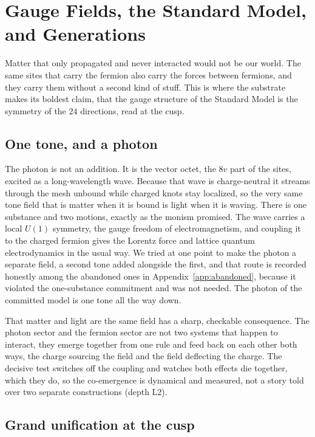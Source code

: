 \section{Gauge Fields, the Standard Model, and Generations}

Matter that only propagated and never interacted would not be our world. The same sites that carry the fermion also carry the forces between fermions, and they carry them without a second kind of stuff. This is where the substrate makes its boldest claim, that the gauge structure of the Standard Model is the symmetry of the $24$ directions, read at the cusp.

\subsection{One tone, and a photon}

The photon is not an addition. It is the vector octet, the $8v$ part of the sites, excited as a long-wavelength wave. Because that wave is charge-neutral it streams through the mesh unbound while charged knots stay localized, so the very same tone field that is matter when it is bound is light when it is waving. There is one substance and two motions, exactly as the monism promised. The wave carries a local $U(1)$ symmetry, the gauge freedom of electromagnetism, and coupling it to the charged fermion gives the Lorentz force and lattice quantum electrodynamics in the usual way. We tried at one point to make the photon a separate field, a second tone added alongside the first, and that route is recorded honestly among the abandoned ones in Appendix~\ref{app:abandoned}, because it violated the one-substance commitment and was not needed. The photon of the committed model is one tone all the way down.

That matter and light are the same field has a sharp, checkable consequence. The photon sector and the fermion sector are not two systems that happen to interact, they emerge together from one rule and feed back on each other both ways, the charge sourcing the field and the field deflecting the charge. The decisive test switches off the coupling and watches both effects die together, which they do, so the co-emergence is dynamical and measured, not a story told over two separate constructions (depth L2).

\subsection{Grand unification at the cusp}

